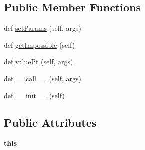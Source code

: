 \subsection*{Public Member Functions}
\begin{DoxyCompactItemize}
\item 
def \hyperlink{classMontePython__cxx_1_1DuBoisMove_ab3b73323c57aa0a66479dae8e27b06d9}{set\+Params} (self, args)
\item 
def \hyperlink{classMontePython__cxx_1_1DuBoisMove_a8d9585c1ea11c8c6499a46ae6e7969de}{get\+Impossible} (self)
\item 
def \hyperlink{classMontePython__cxx_1_1DuBoisMove_a3f32c1a72865be7daf007b84581df35b}{value\+Pt} (self, args)
\item 
def \hyperlink{classMontePython__cxx_1_1DuBoisMove_ac31ce48a51e59000a2157d017256ed8e}{\+\_\+\+\_\+call\+\_\+\+\_\+} (self, args)
\item 
def \hyperlink{classMontePython__cxx_1_1DuBoisMove_aa0c490502c79d926f45931805e87fb92}{\+\_\+\+\_\+init\+\_\+\+\_\+} (self)
\end{DoxyCompactItemize}
\subsection*{Public Attributes}
\begin{DoxyCompactItemize}
\item 
\hypertarget{classMontePython__cxx_1_1DuBoisMove_a39a08d500ea788acb71367af6f73db44}{}{\bfseries this}\label{classMontePython__cxx_1_1DuBoisMove_a39a08d500ea788acb71367af6f73db44}

\end{DoxyCompactItemize}

